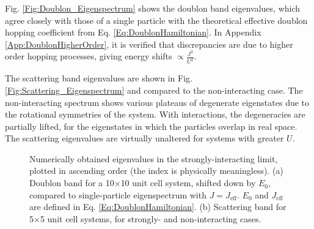 Fig. \ref{Fig:Doublon_Eigenspectrum} shows the doublon band eigenvalues, which agree closely with those of a single particle with the theoretical effective doublon hopping coefficient from Eq. \ref{Eq:DoublonHamiltonian}. In Appendix \ref{App:DoublonHigherOrder}, it is verified that discrepancies are due to higher order hopping processes, giving energy shifts $\propto \frac{J^3}{U^2}$.

The scattering band eigenvalues are shown in Fig. \ref{Fig:Scattering_Eigenspectrum} and compared to the non-interacting case. The non-interacting spectrum shows various plateaus of degenerate eigenstates due to the rotational symmetries of the system. With interactions, the degeneracies are partially lifted, for the eigenstates in which the particles overlap in real space. The scattering eigenvalues are virtually unaltered for systems with greater $U$.

\begin{figure}[ht]
    \centering
    \hfill
    \caption{Numerically obtained eigenvalues in the strongly-interacting limit, plotted in ascending order (the index is physically meaningless). (a) Doublon band for a 10$\times$10 unit cell system, shifted down by $E_0$, compared to single-particle eigenspectrum with $J=J_{\text{eff}}$. $E_0$ and $J_{\text{eff}}$ are defined in Eq. \ref{Eq:DoublonHamiltonian}. (b) Scattering band for 5$\times$5 unit cell systems, for strongly- and non-interacting cases.}
    \label{Fig:Scattering_Doublon_Eigenspectrum}
\end{figure}

